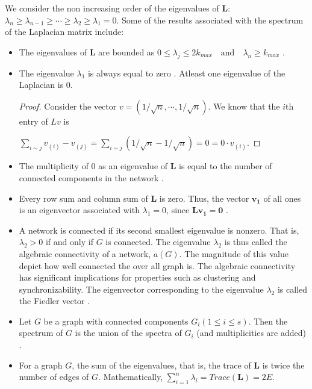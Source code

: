 \documentclass[10pt,a4paper]{article}
\theoremstyle{plain}
\theoremstyle{definition}
\begin{document}
We consider the non increasing order of the eigenvalues of $\mathbf{L}$: $\lambda_n  \geq \lambda_{n-1} \geq  \cdots \geq \lambda_2 \geq \lambda_1 =0 $. Some of the results associated with the spectrum of the Laplacian matrix include:
\begin{itemize}
	\item The eigenvalues of $\mathbf{L}$ are bounded as 
	$ 0 \leq \lambda_j \leq 2k_{max} \quad \text{and} \quad \lambda_n \geq k_{max} $ \citep{estrada2011structure}.
	\item The eigenvalue $\lambda_1$ is always equal to zero \citep{estrada2011structure}. Atleast one eigenvalue of the Laplacian is $0$.
	\begin{proof}
		Consider the vector $v= (1/\sqrt{n}, \cdots, 1/\sqrt{n}) $. We know that the $i$th entry of $Lv$ is 
		
		$\sum_{i\sim j} v_{(i)}- v_{(j)} = \sum_{i\sim j} (1/\sqrt{n} - 1/\sqrt{n}) = 0 = 0 \cdot v_{(i)}$.
	\end{proof}
	\item The multiplicity of $0$ as an eigenvalue of $\mathbf{L}$ is equal to the number of connected components in the network \citep{estrada2011structure}.
	\item Every row sum and column sum of $\mathbf{L}$ is zero. Thus, the vector $\mathbf{v_1}$ of all ones is an eigenvector associated with $\lambda_1 =0$, since $\mathbf{Lv_1} = \mathbf{0} $ \citep{das2004laplacian}.
	\item  A network is connected if its second smallest eigenvalue is nonzero. That is, $\lambda_2> 0$ if and only if $G$ is connected. The eigenvalue $\lambda_2$ is thus called the algebraic connectivity of a network, $a(G)$. The magnitude of this value depict how well connected  the over all graph is. The algebraic connectivity has significant implications for properties such as clustering and synchronizability.
	The eigenvector corresponding to the eigenvalue $\lambda_2$ is called the Fiedler vector \citep{estrada2015first}.
	
	\item Let $G$ be a graph with connected components $G_i (1 \leq i \leq s)$. Then the spectrum of $G$ is the union of the spectra of $G_i$ (and multiplicities are added) \citep{brouwer2011spectra}.
	
	\item For a graph $G$, the sum of the eigenvalues, that is, the trace of $\mathbf{L}$ is twice the number of edges of $G$. Mathematically, $\sum_{i=1}^n \lambda_i = Trace(\mathbf{L}) = 2E.$ \citep{brouwer2011spectra}
\end{itemize}
\end{document}
